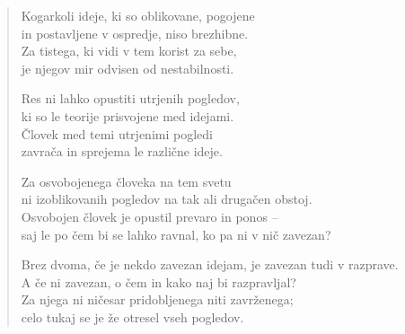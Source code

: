 
\clearpage
\begin{verse}

Kogarkoli ideje, ki so oblikovane, pogojene\\
in postavljene v ospredje, niso brezhibne.\\
Za tistega, ki vidi v tem korist za sebe,\\
je njegov mir odvisen od nestabilnosti.

Res ni lahko opustiti utrjenih pogledov,\\
ki so le teorije prisvojene med idejami.\\
Človek med temi utrjenimi pogledi\\
zavrača in sprejema le različne ideje.

Za osvobojenega človeka na tem svetu\\
ni izoblikovanih pogledov na tak ali drugačen obstoj.\\
Osvobojen človek je opustil prevaro in ponos --\\
saj le po čem bi se lahko ravnal, ko pa ni v nič zavezan?

Brez dvoma, če je nekdo zavezan idejam, je zavezan tudi v razprave.\\
A če ni zavezan, o čem in kako naj bi razpravljal?\\
Za njega ni ničesar pridobljenega niti zavrženega;\\
celo tukaj se je že otresel vseh pogledov.


\end{verse}

